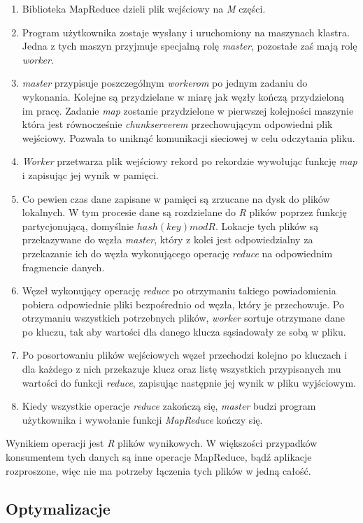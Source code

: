 \begin{enumerate}
 \item Biblioteka MapReduce dzieli plik wejściowy na \emph{M} części.
 \item Program użytkownika zostaje wysłany i uruchomiony na maszynach klastra.
 Jedna z tych maszyn przyjmuje specjalną rolę \emph{master}, pozostałe zaś mają rolę \emph{worker}.
 \item \emph{master} przypisuje poszczególnym \emph{workerom} po jednym zadaniu do wykonania.
 Kolejne są przydzielane w miarę jak węzły kończą przydzieloną im pracę.
 Zadanie \emph{map} zostanie przydzielone w pierwszej kolejności maszynie która jest równocześnie \emph{chunkserverem} przechowującym odpowiedni plik wejściowy.
 Pozwala to uniknąć komunikacji sieciowej w celu odczytania pliku.
 \item \emph{Worker} przetwarza plik wejściowy rekord po rekordzie wywołując funkcję \emph{map} i zapisując jej wynik w pamięci.
 \item Co pewien czas dane zapisane w pamięci są zrzucane na dysk do plików lokalnych.
 W tym procesie dane są rozdzielane do \emph{R} plików poprzez funkcję partycjonującą, domyślnie $hash(key) mod R$.
 Lokacje tych plików są przekazywane do węzła \emph{master}, który z kolei jest odpowiedzialny za przekazanie ich do węzła wykonującego operację \emph{reduce} na odpowiednim fragmencie danych.
 \item Węzeł wykonujący operację \emph{reduce} po otrzymaniu takiego powiadomienia pobiera odpowiednie pliki bezpośrednio od węzła, który je przechowuje.
 Po otrzymaniu wszystkich potrzebnych plików, \emph{worker} sortuje otrzymane dane po kluczu, tak aby wartości dla danego klucza sąsiadowały ze sobą w pliku.
 \item Po posortowaniu plików wejściowych węzeł przechodzi kolejno po kluczach i dla każdego z nich przekazuje klucz oraz listę wszystkich przypisanych mu wartości do funkcji \emph{reduce}, zapisując następnie jej wynik w pliku wyjściowym.
 \item Kiedy wszystkie operacje \emph{reduce} zakończą się, \emph{master} budzi program użytkownika i wywołanie funkcji \emph{MapReduce} kończy się.
\end{enumerate}

Wynikiem operacji jest \emph{R} plików wynikowych.
W większości przypadków konsumentem tych danych są inne operacje MapReduce, bądź aplikacje rozproszone, więc nie ma potrzeby łączenia tych plików w jedną całość.

\subsection*{Optymalizacje}

